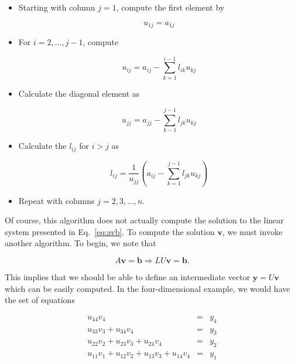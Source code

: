 \documentclass[12pt]{article}
\numberwithin{equation}{section}
\begin{document}
\begin{itemize}
\item Starting with column $j=1$, compute the first element by 

\begin{equation}
\label{eq:ludecomp1}
u_{1j}=a_{1j}
\end{equation}

\item For $i=2,\ldots,j-1$, compute

\begin{equation}
\label{eq:ludecomp2}
u_{ij}=a_{ij}-\sum_{k=1}^{i-1}l_{ik}u_{kj}
\end{equation}

\item Calculate the diagonal element as

\begin{equation}
\label{eq:ludecomp3}
u_{jj}=a_{jj}-\sum_{k-1}^{j-1} l_{jk}u_{kj}
\end{equation}

\item Calculate the $l_{ij}$ for $i>j$ as

\begin{equation}
\label{eq:ludecomp4}
l_{ij}=\frac{1}{u_{jj}}\left(a_{ij}-\sum_{k=1}^{j-1} l_{jk}u_{kj}\right)
\end{equation}

\item Repeat with columns $j=2,3,\ldots,n$.
\end{itemize}

\noindent Of course, this algorithm does not actually compute the solution to the linear system presented in Eq.~\ref{eq:avb}.  To compute the solution $\textbf{v}$, we must invoke another algorithm.  To begin, we note that

\begin{equation}
\label{eq:axbluxb}
A\textbf{v}=\textbf{b}\Rightarrow LU\textbf{v}=\textbf{b}.
\end{equation}
\vspace{.05cm}

\noindent This implies that we should be able to define an intermediate vector $\textbf{y}=U\textbf{v}$ which can be easily computed.  In the four-dimensional example, we would have the set of equations

$$\begin{array}{rcc} u_{44}v_{4}&=&y_{4} \\
u_{33}v_{3}+u_{34}v_{4}&=&y_{3} \\
u_{22}v_{2}+u_{23}v_{3}+u_{24}v_{4}&=&y_{2} \\
u_{11}v_{1}+u_{12}v_{2}+u_{13}v_{3}+u_{14}v_{4}&=& y_{1} \end{array}$$
\end{document}
